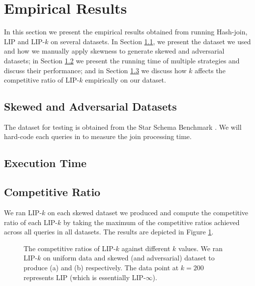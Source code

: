 
\section{Empirical Results}\label{sec:experiment}

In this section we present the empirical results obtained from running Hash-join, LIP and LIP-$k$ on several datasets. In Section \ref{sec:dataset}, we present the dataset we used and how we manually apply skewness to generate skewed and adversarial datasets; in Section \ref{sec:time} we present the running time of multiple strategies and discuss their performance; and in Section \ref{sec:ratio} we discuss how $k$ affects the competitive ratio of LIP-$k$ empirically on our dataset.



\subsection{Skewed and Adversarial Datasets}
\label{sec:dataset}
The dataset for testing is obtained from the Star Schema Benchmark \cite{o2009star}. We will hard-code each queries in \cite{o2009star} to measure the join processing time.



\subsection{Execution Time}
\label{sec:time}



\subsection{Competitive Ratio}
\label{sec:ratio}

We ran LIP-$k$ on each skewed dataset we produced and compute the competitive ratio of each LIP-$k$ by taking the maximum of the competitive ratios achieved across all queries in all datasets. The results are depicted in Figure \ref{fig:cr}. 

\begin{figure}
    \centering
    \quad
    \caption{The competitive ratios of LIP-$k$ against different $k$ values. We ran LIP-$k$ on uniform data and skewed (and adversarial) dataset to produce (a) and (b) respectively. The data point at $k = 200$ represents LIP (which is essentially LIP-$\infty$).}
    \label{fig:cr}
\end{figure}

